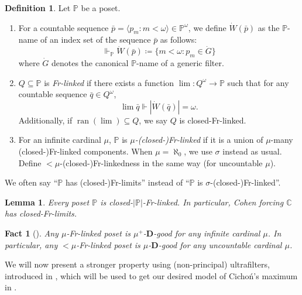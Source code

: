 \documentclass[a4paper,12pt]{amsart}
\newtheorem{lem}[thm]{Lemma}
\newtheorem{fac}[thm]{Fact}
\theoremstyle{definition}
\newtheorem{dfn}[thm]{Definition}
\numberwithin{thm}{section}
\numberwithin{equation}{section}
\newcommand{\p}{\mathbb{P}}
\DeclareMathOperator{\ran}{ran}
\begin{document}
    \begin{dfn}
    	Let $\p$ be a poset.
    	\begin{enumerate}
    		\item For a countable sequence $\bar{p}=\langle p_m:m<\omega\rangle\in\p^\omega$, we define $\dot{W}(\bar{p})$ as the $\p$-name of an index set of the sequence $\bar{p}$ as follows:
            \[
            \Vdash_\p\dot{W}(\bar{p})\coloneq\{m<\omega:p_m\in\dot{G}\}
            \]
            where $\dot{G}$ denotes the canonical $\p$-name of a generic filter.
    		\item $Q\subseteq \p$ is \emph{Fr-linked} if there exists a function $\lim\colon Q^\omega\to\p$ such that for any countable sequence 
    		$\bar{q}\in Q^\omega$, 
    		\begin{equation}
    			\textstyle{\lim\bar{q}} \Vdash |\dot{W}(\bar{q})|=\omega.
    		\end{equation}
            Additionally, if $\ran(\lim)\subseteq Q$, we say $Q$ is closed-Fr-linked.
    		\item For an infinite cardinal $\mu$, $\p$ is \emph{$\mu$-(closed-)Fr-linked} if it is a union of $\mu$-many (closed-)Fr-linked components. When $\mu=\aleph_0$, we use $\sigma$ instead as usual. Define $<\mu$-(closed-)Fr-linkedness in the same way (for uncountable $\mu$). 
    	\end{enumerate}
    	We often say ``$\p$ has (closed-)Fr-limits'' instead of ``$\p$ is $\sigma$-(closed-)Fr-linked''.
    \end{dfn}
    
    \begin{lem}
    	\label{lem:poset_is_its_size_Frlinked}
    	Every poset $\p$ is closed-$|\p|$-Fr-linked. In particular, Cohen forcing $\mathbb{C}$ has closed-Fr-limits.
    \end{lem}
    
    \begin{fac}[\cite{Mej19}]
        \label{fac:Fr_good}
        Any $\mu$-Fr-linked poset is $\mu^+$-$\mathbf{D}$-good for any infinite cardinal $\mu$. In particular, any $<\mu$-Fr-linked poset is $\mu$-$\mathbf{D}$-good for any uncountable cardinal $\mu$.
    \end{fac}
    
    We will now present a stronger property using (non-principal) ultrafilters, introduced in \cite{GMS16}, which will be used to get our desired model of Cicho\'n's maximum in . 
    
\end{document}

